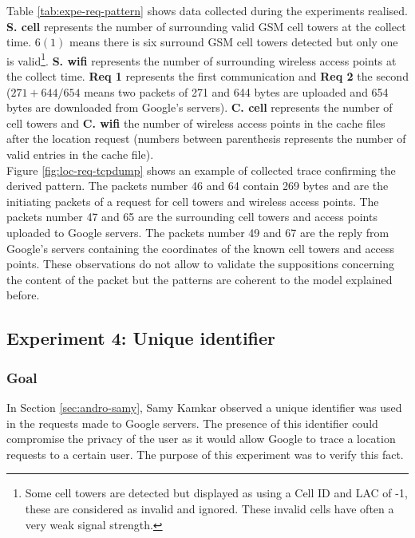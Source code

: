 Table \ref{tab:expe-req-pattern} shows data collected during the experiments realised.
\textbf{S. cell} represents the number of surrounding valid GSM cell towers at the collect time.
$6 (1)$ means there is six surround GSM cell towers detected but only one is valid\footnote{Some cell towers are detected but displayed as using a Cell ID and LAC of -1, these are considered as invalid and ignored. These invalid cells have often a very weak signal strength.}.
\textbf{S. wifi} represents the number of surrounding wireless access points at the collect time.
\textbf{Req 1} represents the first communication and \textbf{Req 2} the second ($271+644/654$ means two packets of 271 and 644 bytes are uploaded and 654 bytes are downloaded from Google's servers).
\textbf{C. cell} represents the number of cell towers and \textbf{C. wifi} the number of wireless access points in the cache files after the location request (numbers between parenthesis represents the number of valid entries in the cache file).\\


Figure \ref{fig:loc-req-tcpdump} shows an example of collected trace confirming the derived pattern.
The packets number 46 and 64 contain 269 bytes and are the initiating packets of a request for cell towers and wireless access points.
The packets number 47 and 65 are the surrounding cell towers and access points uploaded to Google servers.
The packets number 49 and 67 are the reply from Google's servers containing the coordinates of the known cell towers and access points.
These observations do not allow to validate the suppositions concerning the content of the packet but the patterns are coherent to the model explained before.

\subsection{Experiment 4: Unique identifier}

\subsubsection{Goal}

In Section \ref{sec:andro-samy}, Samy Kamkar observed a unique identifier was used in the requests made to Google servers.
The presence of this identifier could compromise the privacy of the user as it would allow Google to trace a location requests to a certain user.
The purpose of this experiment was to verify this fact.

